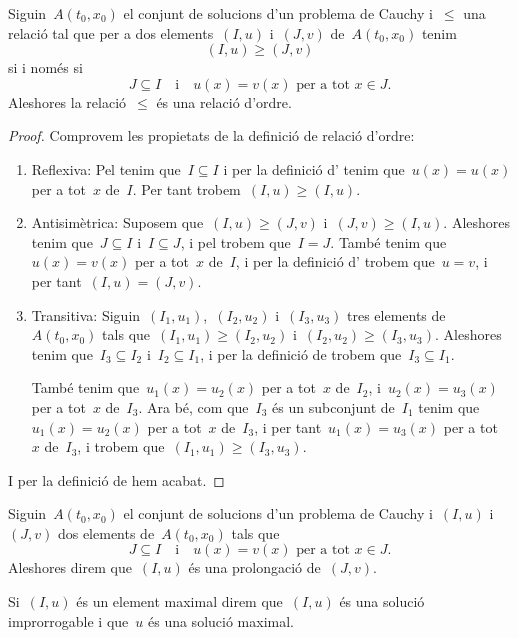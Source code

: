 \documentclass[../../Main.tex]{subfiles}
\begin{document}
	\begin{proposition}
		\label{prop:la prolongació és una relació d'ordre}
		Siguin~\(A(t_{0},x_{0})\) el conjunt de solucions d'un problema de Cauchy i~\(\leq\) una relació tal que per a dos elements~\((I,u)\) i~\((J,v)\) de~\(A(t_{0},x_{0})\) tenim
		\[
		    (I,u)\geq(J,v)
		\]
		si i només si
		\[
		    J\subseteq I\quad\text{i}\quad u(x)=v(x)\text{ per a tot }x\in J.
		\]
		Aleshores la relació~\(\leq\) és una relació d'ordre.
		\begin{proof}
			Comprovem les propietats de la definició de relació d'ordre:
			\begin{enumerate}
				\item Reflexiva: Pel  tenim que~\(I\subseteq I\) i per la definició d' tenim que~\(u(x)=u(x)\) per a tot~\(x\) de~\(I\).
				Per tant trobem~\((I,u)\geq(I,u)\).

				\item Antisimètrica: Suposem que~\((I,u)\geq(J,v)\) i~\((J,v)\geq(I,u)\).
				Aleshores tenim que~\(J\subseteq I\) i~\(I\subseteq J\), i pel  trobem que~\(I=J\).
				També tenim que~\(u(x)=v(x)\) per a tot~\(x\) de~\(I\), i per la definició d' trobem que~\(u=v\), i per tant~\((I,u)=(J,v)\).

				\item Transitiva: Siguin~\((I_{1},u_{1})\),~\((I_{2},u_{2})\) i~\((I_{3},u_{3})\) tres elements de~\(A(t_{0},x_{0})\) tals que~\((I_{1},u_{1})\geq(I_{2},u_{2})\) i~\((I_{2},u_{2})\geq(I_{3},u_{3})\).
				Aleshores tenim que~\(I_{3}\subseteq I_{2}\) i~\(I_{2}\subseteq I_{1}\), i per la definició de  trobem que~\(I_{3}\subseteq I_{1}\).

				També tenim que~\(u_{1}(x)=u_{2}(x)\) per a tot~\(x\) de~\(I_{2}\), i~\(u_{2}(x)=u_{3}(x)\) per a tot~\(x\) de~\(I_{3}\).
				Ara bé, com que~\(I_{3}\) és un subconjunt de~\(I_{1}\) tenim que~\(u_{1}(x)=u_{2}(x)\) per a tot~\(x\) de~\(I_{3}\), i per tant~\(u_{1}(x)=u_{3}(x)\) per a tot~\(x\) de~\(I_{3}\), i trobem que~\((I_{1},u_{1})\geq(I_{3},u_{3})\).
			\end{enumerate}
			I per la definició de  hem acabat.
		\end{proof}
	\end{proposition}
	\begin{definition}[Prolongació]
		\label{def:prolongació}
		\label{def:solució improrrogable}
		\label{def:solució maximal}
		Siguin~\(A(t_{0},x_{0})\) el conjunt de solucions d'un problema de Cauchy i~\((I,u)\) i~\((J,v)\) dos elements de~\(A(t_{0},x_{0})\) tals que
		\[
		    J\subseteq I\quad\text{i}\quad u(x)=v(x)\text{ per a tot }x\in J.
		\]
		Aleshores direm que~\((I,u)\) és una prolongació de~\((J,v)\).

		Si~\((I,u)\) és un element maximal direm que~\((I,u)\) és una solució improrrogable i que~\(u\) és una solució maximal.
	\end{definition}
\end{document}

